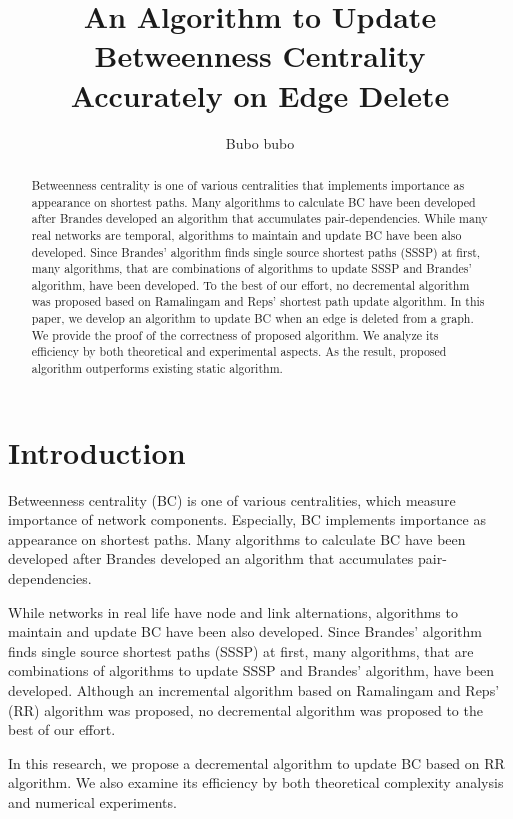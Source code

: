 \documentclass{article}
\title{An Algorithm to Update Betweenness Centrality \\ Accurately on Edge Delete}
\author{Bubo bubo}
\begin{document}
\maketitle

\begin{abstract}
  Betweenness centrality is one of various centralities that implements importance as appearance on shortest paths.
  Many algorithms to calculate BC have been developed after Brandes developed an algorithm that accumulates pair-dependencies.
  While many real networks are temporal, algorithms to maintain and update BC have been also developed.
  Since Brandes’ algorithm finds single source shortest paths (SSSP) at first, many algorithms, that are combinations of algorithms to update SSSP and Brandes’ algorithm, have been developed.
  To the best of our effort, no decremental algorithm was proposed based on Ramalingam and Reps' shortest path update algorithm.
  In this paper, we develop an algorithm to update BC when an edge is deleted from a graph.
  We provide the proof of the correctness of proposed algorithm.
  We analyze its efficiency by both theoretical and experimental aspects.
  As the result, proposed algorithm outperforms existing static algorithm.
\end{abstract}

\section{Introduction}
Betweenness centrality\cite{Freeman1977} (BC) is one of various centralities, which measure importance of network components.
Especially, BC implements importance as appearance on shortest paths.
Many algorithms to calculate BC have been developed after Brandes\cite{Brandes2001} developed an algorithm that accumulates pair-dependencies.

While networks in real life have node and link alternations\cite{Holme2012}, algorithms to maintain and update BC have been also developed.
Since Brandes’ algorithm finds single source shortest paths (SSSP) at first, many algorithms, that are combinations of algorithms to update SSSP and Brandes’ algorithm, have been developed.
Although an incremental algorithm based on Ramalingam and Reps' (RR) algorithm\cite{Ramalingam1996} was proposed, no decremental algorithm was proposed to the best of our effort.

In this research, we propose a decremental algorithm to update BC based on RR algorithm.
We also examine its efficiency by both theoretical complexity analysis and numerical experiments.
\end{document}
